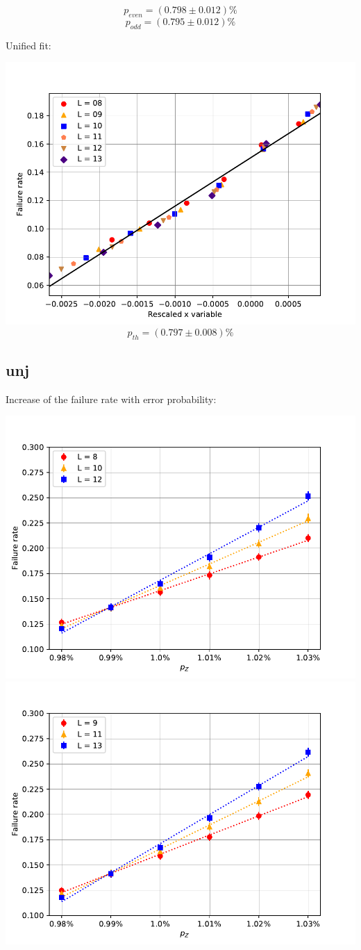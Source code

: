 \documentclass[pra]{revtex4-1}
\begin{document}
\[  p_{even} = (0.798 \pm 0.012)\% \]
\[  p_{odd} = (0.795 \pm 0.012)\% \]
\clearpage 

Unified fit: \begin{center} 

\includegraphics[width=.9\textwidth]{../graphs-paper2/ttv-dephasing-rescaled.pdf}
\[  p_{th} = (0.797 \pm 0.008)\% \] \end{center}
\clearpage 

\subsection*{unj}
\noindent Increase of the failure rate with error probability: 
  
\includegraphics[width=.49\textwidth]{../graphs-paper2/unj-dephasing-even.pdf}
\includegraphics[width=.49\textwidth]{../graphs-paper2/unj-dephasing-odd.pdf}
\end{document}
